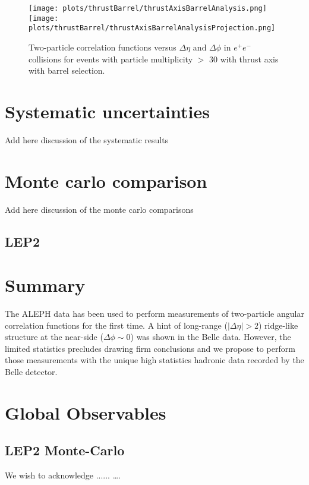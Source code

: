 \documentclass[aps,prl,twocolumn,showpacs,superscriptaddress,groupedaddress]{revtex4}  %
\begin{document}
\begin{figure}[!htb]
\begin{center}
\texttt{[image: plots/thrustBarrel/thrustAxisBarrelAnalysis.png]}
\texttt{[image: plots/thrustBarrel/thrustAxisBarrelAnalysisProjection.png]}
\caption{Two-particle correlation functions versus $\Delta\eta$ and $\Delta\phi$ in $e^{+}e^{-}$ collisions for events with particle multiplicity $>$ 30 with thrust axis with barrel selection.}
\label{fig:figure1} 
\end{center}
\end{figure}



\section{\label{sec:systematic}Systematic uncertainties}
Add here discussion of the systematic results

\section{\label{sec:monteCarlo}Monte carlo comparison}
Add here discussion of the monte carlo comparisons

\subsection{\label{sec:LEP2}LEP2}


\section{\label{sec:summary}Summary}
The ALEPH data has been used to perform measurements of two-particle angular correlation functions for the first time. A hint of long-range ($|\Delta\eta|>2$) ridge-like structure at the
near-side ($\Delta\phi\sim 0$) was shown in the Belle data. However, the limited statistics precludes drawing firm conclusions and we propose to perform those measurements with the unique high statistics hadronic data recorded by the Belle detector.


\section{\label{sec:datasample}Global Observables}
\subsection{LEP2 Monte-Carlo}

\begin{acknowledgments}
We wish to acknowledge ......
\dots.
\end{acknowledgments}

\nocite{*}

\end{document}
